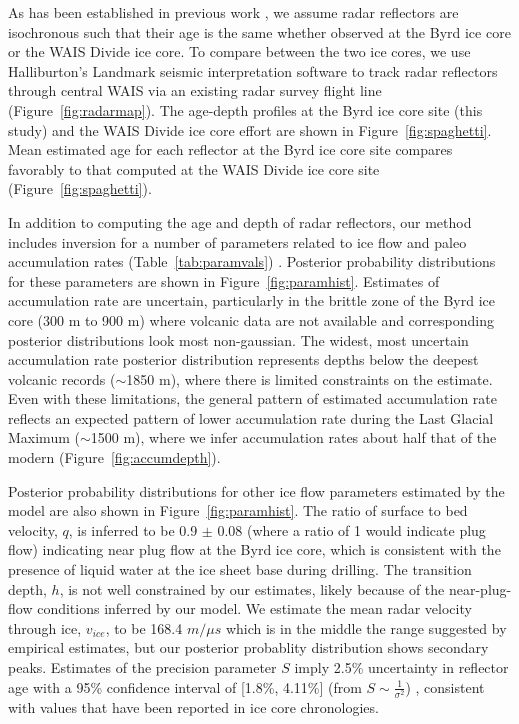 As has been established in previous work \citep{siegert1998,dowdeswell2004}, we assume radar reflectors are isochronous such that their age is the same whether observed at the Byrd ice core or the WAIS Divide ice core. To compare between the two ice cores, we use Halliburton's Landmark seismic interpretation software to track radar reflectors through central WAIS via an existing radar survey flight line (Figure~\ref{fig:radarmap}). The age-depth profiles at the Byrd ice core site (this study) and the WAIS Divide ice core effort \citep{buizert2015} are shown in Figure~\ref{fig:spaghetti}. Mean estimated age for each reflector at the Byrd ice core site compares favorably to that computed at the WAIS Divide ice core site (Figure~\ref{fig:spaghetti}).  

In addition to computing the age and depth of radar reflectors, our method includes inversion for a number of parameters related to ice flow and paleo accumulation rates (Table~\ref{tab:paramvals}) . Posterior probability distributions for these parameters are shown in Figure~\ref{fig:paramhist}. Estimates of accumulation rate are uncertain, particularly in the brittle zone of the Byrd ice core (300 m to 900 m) where volcanic data are not available and corresponding posterior distributions look most non-gaussian. The widest, most uncertain accumulation rate posterior distribution represents depths below the deepest volcanic records ($\sim$1850 m), where there is limited constraints on the estimate. Even with these limitations, the general pattern of estimated accumulation rate reflects an expected pattern of lower accumulation rate during the Last Glacial Maximum ($\sim$1500 m), where we infer accumulation rates about half that of the modern (Figure~\ref{fig:accumdepth}). 

Posterior probability distributions for other ice flow parameters estimated by the model are also shown in Figure~\ref{fig:paramhist}. The ratio of surface to bed velocity, $q$, is inferred to be 0.9 $\pm$ 0.08 (where a ratio of 1 would indicate plug flow) indicating near plug flow at the Byrd ice core, which is consistent with the presence of liquid water at the ice sheet base during drilling. The transition depth, $h$, is not well constrained by our estimates, likely because of the near-plug-flow conditions inferred by our model.
We estimate the mean radar velocity through ice, $v_{ice}$, to be 168.4 $m/{\mu}s$ which is in the middle the range suggested by empirical estimates, but our posterior probablity distribution shows secondary peaks. Estimates of the precision parameter $S$ imply 2.5\% uncertainty in reflector age with a 95\% confidence interval of [1.8\%, 4.11\%] (from $S \sim \frac{1}{\sigma^2}$)%
, consistent with values that have been reported in ice core chronologies.

